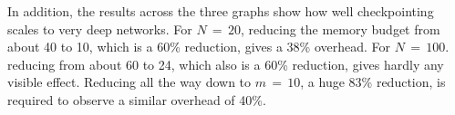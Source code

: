 In addition, the results across the three graphs show how well checkpointing scales to very deep networks.
For \(N\,=\,20\), reducing the memory budget from about 40 to 10, which is a 60\% reduction, gives a 38\% overhead.
For \(N\,=\,100\). reducing from about 60 to 24, which also is a 60\% reduction, gives hardly any visible effect.
Reducing all the way down to \(m\,=\,10\), a huge 83\% reduction, is required to observe a similar overhead of 40\%.
